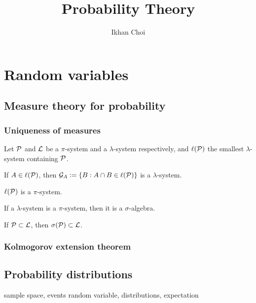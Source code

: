 \documentclass{../note}
\begin{document}
\title{Probability Theory}
\author{Ikhan Choi}
\maketitle
\tableofcontents


\part{Random variables}
\chapter{Measure theory for probability}

\section{Uniqueness of measures}
\begin{prb}
Let $\mathcal{P}$ and $\mathcal{L}$ be a $\pi$-system and a $\lambda$-system respectively, and $\ell(\mathcal{P})$ the smallest $\lambda$-system containing $\mathcal{P}$.
\begin{parts}
\item If $A\in\ell(\mathcal{P})$, then $\mathcal{G}_A:=\{B:A\cap B\in\ell(\mathcal{P})\}$ is a $\lambda$-system.
\item $\ell(\mathcal{P})$ is a $\pi$-system.
\item If a $\lambda$-system is a $\pi$-system, then it is a $\sigma$-algebra.
\item If $\mathcal{P}\subset\mathcal{L}$, then $\sigma(\mathcal{P})\subset\mathcal{L}$.
\end{parts}
\end{prb}

\begin{prb}
\end{prb}

\section{Kolmogorov extension theorem}










\chapter{Probability distributions}

sample space, events
random variable, distributions, expectation
\end{document}
